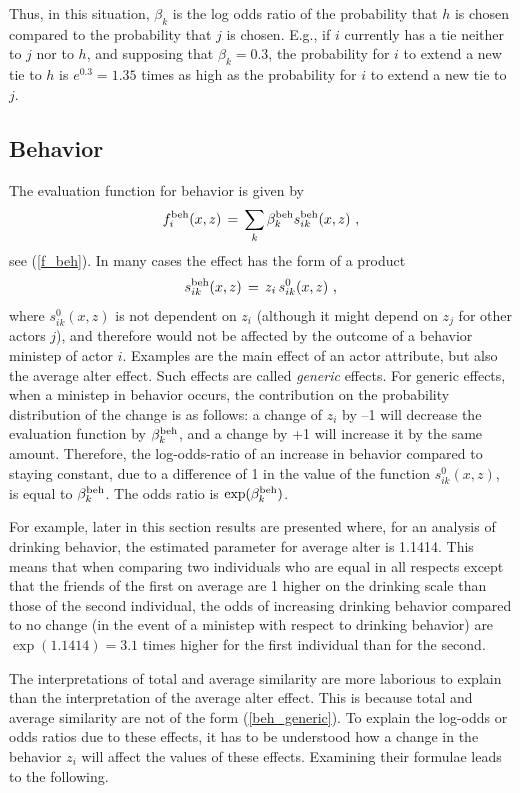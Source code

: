 \documentclass[a4paper,fleqn,11pt]{article}
\newcommand{\+}{\, + \,}
\begin{document}
Thus, in this situation, $\beta_k$ is the log odds ratio of the probability
that $h$ is chosen compared to the probability that $j$ is chosen.
E.g., if $i$ currently has a tie neither to $j$ nor to $h$,
and supposing that $\beta_k = 0.3$, the probability for $i$ to
extend a new tie to $h$ is $e^{0.3} = 1.35$ times as high
as the probability for $i$ to extend a new tie to $j$.

\subsection{Behavior}

The evaluation function for behavior is given by
\[
f^{\rm beh}_i(x, z) \, = \, \sum_k \beta^{\rm beh}_k s^{\rm beh}_{ik}(x, z) \ ,
\]
see (\ref{f_beh}).
In many cases the effect has the form of a product
\begin{equation}
s^{\rm beh}_{ik}(x, z) \,=\, z_i \,s^{0}_{ik}(x, z) \ ,  \label{beh_generic}
\end{equation}
where $s^{0}_{ik}(x, z)$ is not dependent on $z_i$
(although it might depend on $z_j$ for other actors $j$), and therefore
would not be affected by the outcome of a behavior ministep of actor $i$.
Examples are the main effect of an actor attribute, but also the
average alter effect.
Such effects are called \emph{generic} effects.
For generic effects, when a ministep in behavior occurs, the contribution
on the probability distribution of the change is as follows:
a change of $z_i $ by --1 will decrease the evaluation function by
$\beta^{\rm beh}_k$, and a change by +1 will increase it by the same amount.
Therefore, the log-odds-ratio of an increase in behavior compared to
staying constant, due to a difference of 1 in the
value of the function $s^{0}_{ik}(x, z)$, is equal to
$\beta^{\rm beh}_k$. The odds ratio is $\exp(\beta^{\rm beh}_k)$.

For example, later in this section results are presented where,
for an analysis of drinking behavior, the
estimated parameter for average alter is 1.1414.
This means that when comparing two individuals who are equal in all respects
except that the friends of the first on average are  1 higher
on the drinking scale than those of the second individual,
the odds of increasing drinking behavior compared to no change
(in the event of a ministep with respect to drinking behavior)
are $\exp(1.1414) = 3.1$ times higher for the first individual
than for the second.

The interpretations of total and average similarity are more laborious
to explain than the interpretation of the average alter effect.
This is because total and average similarity are not of the form
(\ref{beh_generic}). To explain the log-odds or odds ratios due to these
effects, it has to be understood how a change in the behavior $z_i$
will affect the values of these effects.
Examining their formulae leads to the following.
\end{document}
